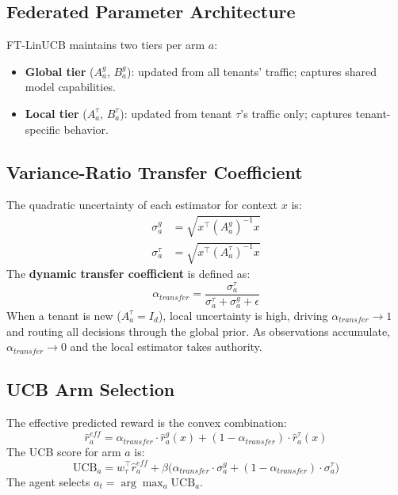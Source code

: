 \documentclass[conference]{IEEEtran}
\begin{document}
\subsection{Federated Parameter Architecture}

FT-LinUCB maintains two tiers per arm $a$:

\begin{itemize}
  \item \textbf{Global tier} ($A^g_a$, $B^g_a$): updated from all
    tenants' traffic; captures shared model capabilities.
  \item \textbf{Local tier} ($A^\tau_a$, $B^\tau_a$): updated from
    tenant $\tau$'s traffic only; captures tenant-specific behavior.
\end{itemize}

\subsection{Variance-Ratio Transfer Coefficient}

The quadratic uncertainty of each estimator for context $x$ is:
\begin{align}
  \sigma^g_a &= \sqrt{x^\top (A^g_a)^{-1} x} \\
  \sigma^\tau_a &= \sqrt{x^\top (A^\tau_a)^{-1} x}
\end{align}
The \textbf{dynamic transfer coefficient} is defined as:
\begin{equation}
  \alpha_{transfer} = \frac{\sigma^\tau_a}
    {\sigma^\tau_a + \sigma^g_a + \epsilon}
  \label{eq:alpha}
\end{equation}
When a tenant is new ($A^\tau_a = I_d$), local uncertainty is high,
driving $\alpha_{transfer} \to 1$ and routing all decisions through the
global prior. As observations accumulate, $\alpha_{transfer} \to 0$ and
the local estimator takes authority.

\subsection{UCB Arm Selection}

The effective predicted reward is the convex combination:
\begin{equation}
  \hat{r}^{eff}_a = \alpha_{transfer} \cdot \hat{r}^g_a(x)
                  + (1 - \alpha_{transfer}) \cdot \hat{r}^\tau_a(x)
\end{equation}
The UCB score for arm $a$ is:
\begin{equation}
  \text{UCB}_a = w_\tau^\top \hat{r}^{eff}_a
               + \beta \bigl(\alpha_{transfer} \cdot \sigma^g_a
               + (1 - \alpha_{transfer}) \cdot \sigma^\tau_a\bigr)
\end{equation}
The agent selects $a_t = \arg\max_{a} \text{UCB}_a$.
\end{document}
